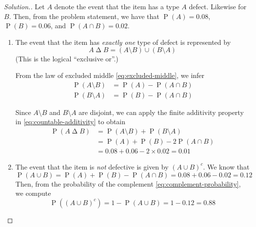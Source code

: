 \documentclass[11pt]{article}
\makeatletter
\theoremstyle{definition}
\theoremstyle{remark}
\newenvironment{solution}{
    \let\oldqedsymbol=\qedsymbol%
    \def\@addpunct##1{}%
    \renewcommand{\qedsymbol}{$\blacktriangleleft$}%
    \begin{proof}[\textit Solution.]
}{
    \end{proof}%
    \renewcommand{\qedsymbol}{\oldqedsymbol}
}
\newcommand{\parens}[1]{\left(#1\right)}
\newcommand{\union}{\cup}
\newcommand{\intersn}{\cap}
\newcommand{\symdiff}{\mathbin{\Delta}}
\DeclareMathOperator{\Prob}{P}
\renewcommand{\P}[1]{\Prob{\parens{#1}}}
\makeatother
\begin{document}
\begin{solution}
    Let $A$ denote the event that the item has a type $A$ defect.
    Likewise for $B$. Then, from the problem statement, we have that
    $\P{A} = 0.08$, $\P{B} = 0.06$, and $\P{A \intersn B} = 0.02$.

    \begin{enumerate}
        \item
            The event that the item has \emph{exactly one} type of defect is
            represented by
            \begin{equation*}
                A \symdiff B = (A \setminus B) \union (B \setminus A)
            \end{equation*}
            (This is the logical ``exclusive or''.)

            From the law of excluded middle \eqref{eq:excluded-middle}, we
            infer
            \begin{align*}
                \P{A \setminus B} &= \P{A} - \P{A \intersn B} \\
                \P{B \setminus A} &= \P{B} - \P{A \intersn B}
            \end{align*}

            Since $A \setminus B$ and $B \setminus A$ are disjoint, we can
            apply the finite additivity property in
            \eqref{eq:countable-additivity} to obtain
            \begin{align*}
                \P{A \symdiff B}
                &= \P{A \setminus B} + \P{B \setminus A} \\
                &= \P{A} + \P{B}- 2\P{A \intersn B} \\
                &= 0.08 + 0.06 - 2 \times 0.02 = 0.01
            \end{align*}

        \item
            The event that the item is \emph{not} defective is given by
            $(A \union B)^c$. We know that
            \begin{equation*}
                \P{A \union B}
                = \P{A} + \P{B} - \P{A \intersn B}
                = 0.08 + 0.06 - 0.02
                = 0.12
            \end{equation*}
            Then, from the probability of the complement
            \eqref{eq:complement-probability}, we compute
            \begin{equation*}
                \P{(A \union B)^c} = 1 - \P{A \union B} = 1 - 0.12 = 0.88
            \end{equation*}

    \end{enumerate}
\end{solution}
\end{document}
